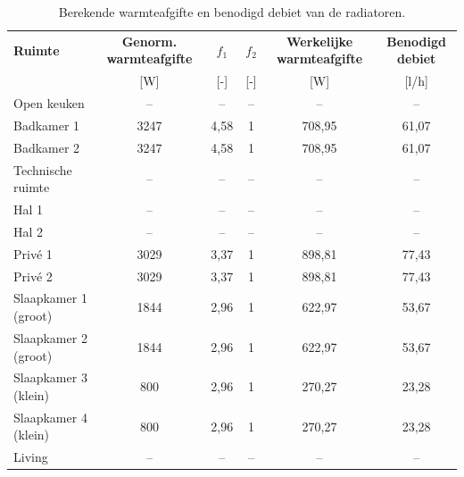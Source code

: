 \documentclass[a4paper,12pt]{article}
\begin{document}
\begin{table}[H]
\centering
\small
\caption{Berekende warmteafgifte en benodigd debiet van de radiatoren.}
\label{tab:warmteafgifte_radiatoren}

\begin{tabularx}{\textwidth}{X c c c c c}
\toprule
\rowcolor{gray!20}
\textbf{Ruimte} &
\textbf{Genorm. warmteafgifte} &
\textbf{$f_1$} &
\textbf{$f_2$} &
\textbf{Werkelijke warmteafgifte} &
\textbf{Benodigd debiet} \\

\rowcolor{gray!20}
&
\scriptsize[W] &
\scriptsize[-] &
\scriptsize[-] &
\scriptsize[W] &
\scriptsize[l/h] \\
\midrule

Open keuken &
-- &
-- &
-- &
-- &
-- \\

Badkamer 1 &
3247 &
4,58 &
1 &
708,95 &
61,07 \\

Badkamer 2 &
3247 &
4,58 &
1 &
708,95 &
61,07 \\

Technische ruimte &
-- &
-- &
-- &
-- &
-- \\

Hal 1 &
-- &
-- &
-- &
-- &
-- \\

Hal 2 &
-- &
-- &
-- &
-- &
-- \\

Privé 1 &
3029 &
3,37 &
1 &
898,81 &
77,43 \\

Privé 2 &
3029 &
3,37 &
1 &
898,81 &
77,43 \\

Slaapkamer 1 (groot) &
1844 &
2,96 &
1 &
622,97 &
53,67 \\

Slaapkamer 2 (groot) &
1844 &
2,96 &
1 &
622,97 &
53,67 \\

Slaapkamer 3 (klein) &
800 &
2,96 &
1 &
270,27 &
23,28 \\

Slaapkamer 4 (klein) &
800 &
2,96 &
1 &
270,27 &
23,28 \\

Living &
-- &
-- &
-- &
-- &
-- \\

\bottomrule
\end{tabularx}
\end{table}
\end{document}

